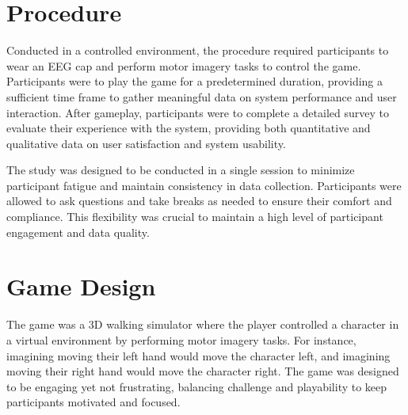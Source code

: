 \section{Procedure}
Conducted in a controlled environment, the procedure required participants to wear an EEG cap and perform motor imagery tasks to control the game. 
Participants were to play the game for a predetermined duration, providing a sufficient time frame to gather meaningful data on system performance and user interaction.
After gameplay, participants were to complete a detailed survey to evaluate their experience with the system, providing both quantitative and qualitative data on user satisfaction and system usability.

The study was designed to be conducted in a single session to minimize participant fatigue and maintain consistency in data collection. 
Participants were allowed to ask questions and take breaks as needed to ensure their comfort and compliance. 
This flexibility was crucial to maintain a high level of participant engagement and data quality.

\section{Game Design}
The game was a 3D walking simulator where the player controlled a character in a virtual environment by performing motor imagery tasks.
For instance, imagining moving their left hand would move the character left, and imagining moving their right hand would move the character right. 
The game was designed to be engaging yet not frustrating, balancing challenge and playability to keep participants motivated and focused.

